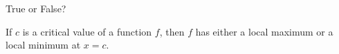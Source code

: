 \documentclass{ximera}
\author{Gregory Hartman \and Matthew Carr}
\begin{document}
\begin{exercise}



True or False?
\begin{center}
If $c$ is a critical value of a function $f$, then $f$ has either a local maximum or a local minimum at $x=c$.
\end{center}

\begin{prompt}
\begin{multipleChoice}
\end{multipleChoice}
\end{prompt}
\end{exercise}
\end{document}
